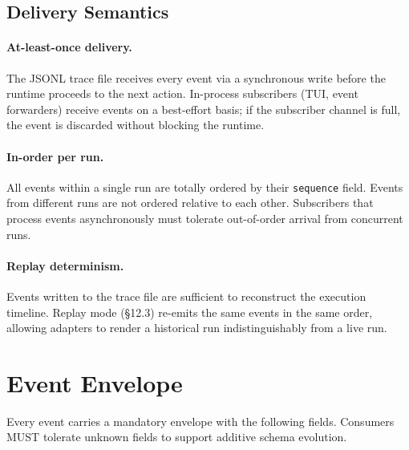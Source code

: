 \subsection{Delivery Semantics}

\paragraph{At-least-once delivery.} The JSONL trace file receives every event via a synchronous write before the runtime proceeds to the next action. In-process subscribers (TUI, event forwarders) receive events on a best-effort basis; if the subscriber channel is full, the event is discarded without blocking the runtime.

\paragraph{In-order per run.} All events within a single run are totally ordered by their \texttt{sequence} field. Events from different runs are not ordered relative to each other. Subscribers that process events asynchronously must tolerate out-of-order arrival from concurrent runs.

\paragraph{Replay determinism.} Events written to the trace file are sufficient to reconstruct the execution timeline. Replay mode (§12.3) re-emits the same events in the same order, allowing adapters to render a historical run indistinguishably from a live run.

\section{Event Envelope}

Every event carries a mandatory envelope with the following fields. Consumers MUST tolerate unknown fields to support additive schema evolution.

